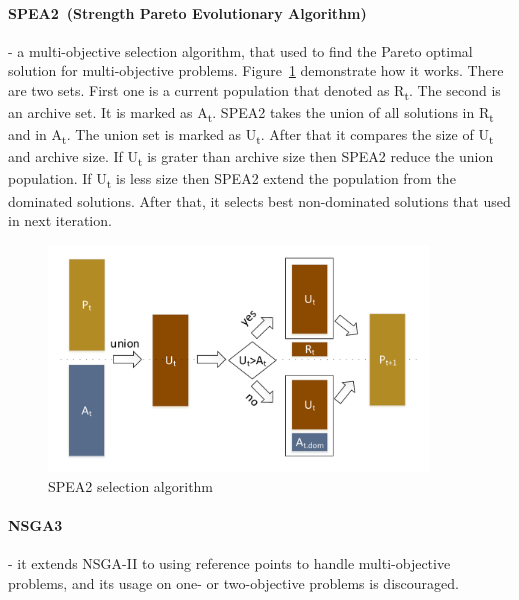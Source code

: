 \paragraph{SPEA2~(Strength Pareto Evolutionary Algorithm)~\cite{zitzler01}} - a multi-objective selection algorithm, that used to find the Pareto optimal solution for multi-objective problems\cite{zhihuan2010}. Figure~\ref{fig:spea2} demonstrate how it works.
There are two sets. First one is a current population that denoted as \texorpdfstring{R\textsubscript{t}}{R t}. The second is an archive set. It is marked as \texorpdfstring{A\textsubscript{t}}{A t}. SPEA2 takes the union of all solutions in \texorpdfstring{R\textsubscript{t}}{R t} and in \texorpdfstring{A\textsubscript{t}}{A t}. The union set is marked as \texorpdfstring{U\textsubscript{t}}{U t}. After that it compares the size of \texorpdfstring{U\textsubscript{t}}{U t} and archive size. If \texorpdfstring{U\textsubscript{t}}{U t} is grater than archive size then SPEA2 reduce the union population. If \texorpdfstring{U\textsubscript{t}}{U t} is less  size then SPEA2 extend the population from the dominated solutions. After that, it selects best non-dominated solutions that used in next iteration.

\begin{figure}
	\centering
	\includegraphics[width=0.9\textwidth]{images/spea2Selector.pdf}
	\caption[SPEA2 selection algorithm]{SPEA2 selection algorithm}
	\label{fig:spea2}
\end{figure}

\paragraph{NSGA3~\cite{deb14}} - it extends NSGA-II to using reference points to handle multi-objective problems, and its usage on one- or two-objective problems is discouraged.
